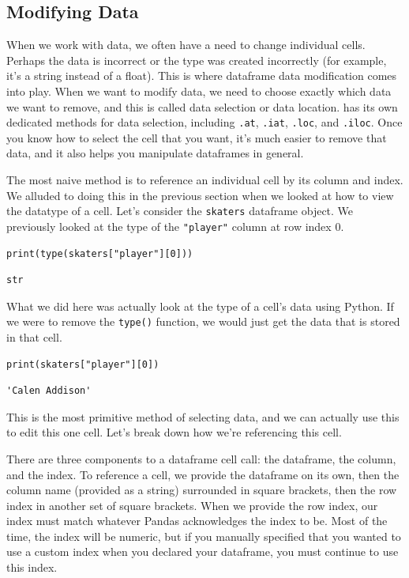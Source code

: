 \subsection{Modifying Data}
When we work with data, we often have a need to change individual cells. Perhaps the data is incorrect or the type was created incorrectly (for example, it's a string instead of a float). This is where dataframe data modification comes into play. When we want to modify data, we need to choose exactly which data we want to remove, and this is called data selection or data location.  has its own dedicated methods for data selection, including \verb|.at|, \verb|.iat|, \verb|.loc|, and \verb|.iloc|. Once you know how to select the cell that you want, it's much easier to remove that data, and it also helps you manipulate dataframes in general.\par
The most naive method is to reference an individual cell by its column and index. We alluded to doing this in the previous section when we looked at how to view the datatype of a cell. Let's consider the \verb|skaters| dataframe object. We previously looked at the type of the \verb|"player"| column at row index 0.\par
\begin{lstlisting}[style=pippython]
print(type(skaters["player"][0]))
\end{lstlisting}
\begin{lstlisting}[style=none]
str
\end{lstlisting}
What we did here was actually look at the type of a cell's data using Python. If we were to remove the \verb|type()| function, we would just get the data that is stored in that cell.\par
\begin{lstlisting}[style=pippython]
print(skaters["player"][0])
\end{lstlisting}
\begin{lstlisting}[style=none]
'Calen Addison'
\end{lstlisting}
This is the most primitive method of selecting data, and we can actually use this to edit this one cell. Let's break down how we're referencing this cell.\par
There are three components to a dataframe cell call: the dataframe, the column, and the index. To reference a cell, we provide the dataframe on its own, then the column name (provided as a string) surrounded in square brackets, then the row index in another set of square brackets. When we provide the row index, our index must match whatever Pandas acknowledges the index to be. Most of the time, the index will be numeric, but if you manually specified that you wanted to use a custom index when you declared your dataframe, you must continue to use this index.\par
